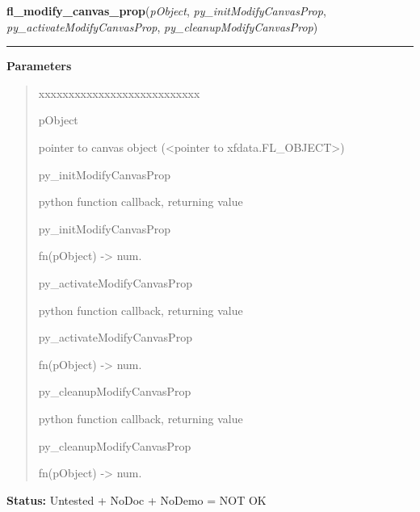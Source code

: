 \hspace{.8\funcindent}\begin{boxedminipage}{\funcwidth}

    \raggedright \textbf{fl\_modify\_canvas\_prop}(\textit{pObject}, \textit{py\_initModifyCanvasProp}, \textit{py\_activateModifyCanvasProp}, \textit{py\_cleanupModifyCanvasProp})

    \vspace{-1.5ex}

    \rule{\textwidth}{0.5\fboxrule}
\setlength{\parskip}{2ex}
\setlength{\parskip}{1ex}
      \textbf{Parameters}
      \vspace{-1ex}

      \begin{quote}
        \begin{Ventry}{xxxxxxxxxxxxxxxxxxxxxxxxxxx}

          \item[pObject]

          pointer to canvas object ({\textless}pointer to 
          xfdata.FL\_OBJECT{\textgreater})

          \item[py\_initModifyCanvasProp]

          python function callback, returning value

          \item[py\_initModifyCanvasProp]

          fn(pObject) -{\textgreater} num.

          \item[py\_activateModifyCanvasProp]

          python function callback, returning value

          \item[py\_activateModifyCanvasProp]

          fn(pObject) -{\textgreater} num.

          \item[py\_cleanupModifyCanvasProp]

          python function callback, returning value

          \item[py\_cleanupModifyCanvasProp]

          fn(pObject) -{\textgreater} num.

        \end{Ventry}

      \end{quote}

\textbf{Status:} Untested + NoDoc + NoDemo = NOT OK



    \end{boxedminipage}

